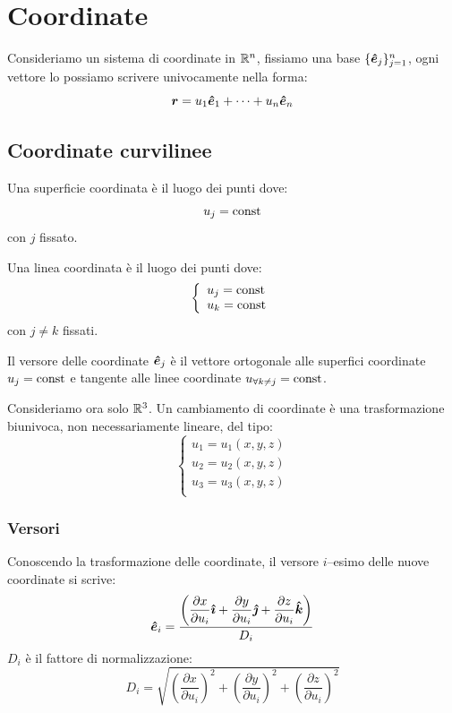 \section{Coordinate}
Consideriamo un sistema di coordinate in $\mathbb{R}^n$, fissiamo una base $\{\boldsymbol{\hat {e}}_j\}_{j=1}^n$, ogni vettore lo possiamo scrivere univocamente nella forma:
\begin{equation*}\boldsymbol{r}=u_1\boldsymbol{\hat {e}}_1+\cdots+u_n\boldsymbol{\hat {e}}_n\end{equation*}
\subsection{Coordinate curvilinee}
\begin{Def}
Una superficie coordinata  è il luogo dei punti dove:
\begin{equation*}u_j=\text{const}\end{equation*}
con $j$ fissato.
\end{Def}
\begin{Def}
Una linea coordinata  è il luogo dei punti dove:
\begin{equation*}
\left\{\begin{array}{l}
u_j=\text{const}\\
u_k=\text{const}
\end{array}\right.
\end{equation*}
con $j\neq k$ fissati.
\end{Def}
\begin{Def}
Il versore delle coordinate $\boldsymbol{\hat {e}}_j$ è il vettore ortogonale alle superfici coordinate $u_j=\text{const}$ e tangente alle linee coordinate $u_{\forall k\neq j}=\text{const}$.
\end{Def}
Consideriamo ora solo $\mathbb{R}^3$. Un cambiamento di coordinate è una trasformazione biunivoca, non necessariamente lineare, del tipo:
\begin{equation*}
\left\{\begin{array}{l}
u_1=u_1(x,y,z)\\
u_2=u_2(x,y,z)\\
u_3=u_3(x,y,z)\\
\end{array}\right.
\end{equation*}
\subsubsection{Versori}
Conoscendo la trasformazione delle coordinate, il versore $i$--esimo delle nuove coordinate si scrive:
\begin{equation*}\boldsymbol{\hat {e}}_i=\dfrac{\left(\dfrac{\partial x}{\partial u_i}\boldsymbol{\hat {\imath}}+\dfrac{\partial y}{\partial u_i}\boldsymbol{\hat {\jmath}}+\dfrac{\partial z}{\partial u_i}\boldsymbol{\hat {k}}\right) }{D_i}\end{equation*}
$D_i$ è il fattore di normalizzazione:
\begin{equation*}D_i=\sqrt{\left(\frac{\partial x}{\partial u_i}\right)^2+\left(\frac{\partial y}{\partial u_i}\right)^2+\left(\frac{\partial z}{\partial u_i}\right)^2}\end{equation*}
